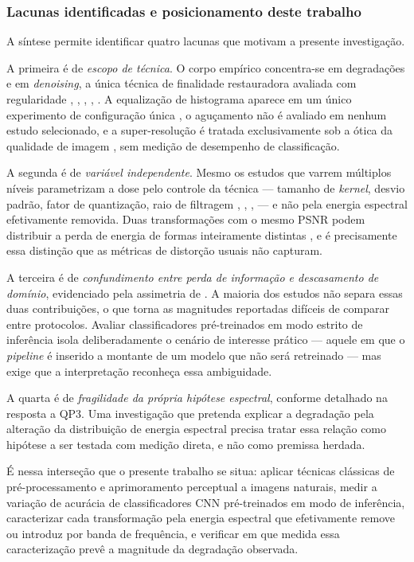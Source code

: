 \documentclass[conference]{IEEEtran}
\begin{document}
\subsubsection{Lacunas identificadas e posicionamento deste trabalho}

A síntese permite identificar quatro lacunas que motivam a presente
investigação.

A primeira é de \emph{escopo de técnica}. O corpo empírico concentra-se em
degradações e em \textit{denoising}, a única técnica de finalidade restauradora
avaliada com regularidade \cite{b6}, \cite{b7}, \cite{b8}, \cite{b9},
\cite{b26}. A equalização de histograma aparece em um único experimento de
configuração única \cite{b6}, o aguçamento não é avaliado em nenhum estudo
selecionado, e a super-resolução é tratada exclusivamente sob a ótica da
qualidade de imagem \cite{b3}, sem medição de desempenho de classificação.

A segunda é de \emph{variável independente}. Mesmo os estudos que varrem
múltiplos níveis parametrizam a dose pelo controle da técnica --- tamanho de
\textit{kernel}, desvio padrão, fator de quantização, raio de filtragem
\cite{b1}, \cite{b4}, \cite{b5}, \cite{b28} --- e não pela energia espectral
efetivamente removida. Duas transformações com o mesmo PSNR podem distribuir a
perda de energia de formas inteiramente distintas \cite{b13}, e é precisamente
essa distinção que as métricas de distorção usuais não capturam.

A terceira é de \emph{confundimento entre perda de informação e descasamento de
domínio}, evidenciado pela assimetria de \cite{b23}. A maioria dos estudos não
separa essas duas contribuições, o que torna as magnitudes reportadas difíceis
de comparar entre protocolos. Avaliar classificadores pré-treinados em modo
estrito de inferência isola deliberadamente o cenário de interesse prático ---
aquele em que o \textit{pipeline} é inserido a montante de um modelo que não
será retreinado --- mas exige que a interpretação reconheça essa ambiguidade.

A quarta é de \emph{fragilidade da própria hipótese espectral}, conforme
detalhado na resposta a QP3. Uma investigação que pretenda explicar a
degradação pela alteração da distribuição de energia espectral precisa tratar
essa relação como hipótese a ser testada com medição direta, e não como
premissa herdada.

É nessa interseção que o presente trabalho se situa: aplicar técnicas clássicas
de pré-processamento e aprimoramento perceptual a imagens naturais, medir a
variação de acurácia de classificadores CNN pré-treinados em modo de
inferência, caracterizar cada transformação pela energia espectral que
efetivamente remove ou introduz por banda de frequência, e verificar em que
medida essa caracterização prevê a magnitude da degradação observada.
\end{document}
